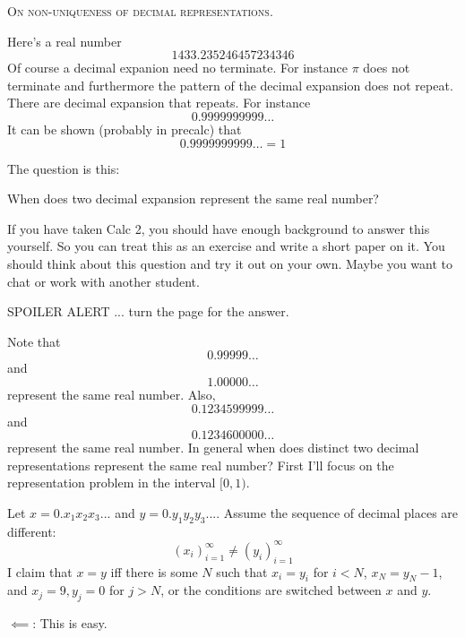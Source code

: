 \newpage
\textsc{On non-uniqueness of decimal representations}.

Here's a real number
\[
1433.235246457234346
\]
Of course a decimal expanion need no terminate.
For instance $\pi$ does not terminate and furthermore the pattern
of the decimal expansion does not repeat.
There are decimal expansion that repeats.
For instance
\[
0.9999999999\ldots
\]
It can be shown (probably in precalc) that
\[
0.9999999999\ldots = 1
\]

The question is this:

\begin{ex}
  When does two decimal expansion represent the same real number?
\end{ex}

If you have taken Calc 2, you should have enough background to answer
this yourself.
So you can treat this as an exercise and write a short paper on it.
You should think about this question and try it out on your own.
Maybe you want to chat or work with another student.

SPOILER ALERT ... turn the page for the answer.


\newpage
Note that
\[
0.99999\ldots
\]
and
\[
1.00000\ldots
\]
represent the same real number.
Also,
\[
0.1234599999\ldots
\]
and
\[
0.1234600000\ldots
\]
represent the same real number.
In general when does distinct two decimal representations represent the
same real number?
First I'll focus on the representation problem in the interval $[0,1)$.

Let
$x = 0.x_1x_2x_3...$
and
$y = 0.y_1y_2y_3...$.
Assume the sequence of decimal places are different:
\[
(x_i)_{i=1}^\infty
\neq
(y_i)_{i=1}^\infty
\]
I claim that $x = y$ iff there is some $N$ such that
$x_i = y_i$ for $i < N$,
$x_N = y_N - 1$, and
$x_j = 9, y_j = 0$ for $j > N$, or the conditions are switched between
$x$ and $y$.

$\impliedby$: This is easy.

